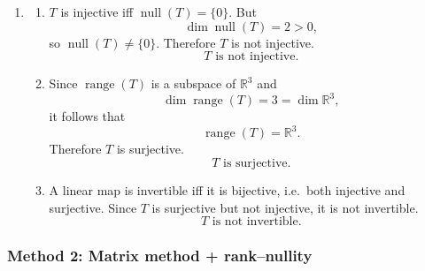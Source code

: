 \documentclass[12pt]{article}
\begin{document}
\begin{enumerate}[label=(\alph*)]
Thus
\[
\boxed{\dim\operatorname{null}(T)=2,\qquad \dim\operatorname{range}(T)=3.}
\]

\item
\begin{enumerate}[label=(\roman*)]
\item $T$ is injective iff $\operatorname{null}(T)=\{0\}$. But
\[
\dim\operatorname{null}(T)=2>0,
\]
so $\operatorname{null}(T)\neq\{0\}$. Therefore $T$ is not injective.
\[
\boxed{\,T\text{ is not injective.}\,}
\]

\item Since $\operatorname{range}(T)$ is a subspace of $\mathbb{R}^3$ and
\[
\dim\operatorname{range}(T)=3=\dim\mathbb{R}^3,
\]
it follows that
\[
\operatorname{range}(T)=\mathbb{R}^3.
\]
Therefore $T$ is surjective.
\[
\boxed{\,T\text{ is surjective.}\,}
\]

\item A linear map is invertible iff it is bijective, i.e.\ both injective and surjective. Since $T$ is surjective but not injective, it is not invertible.
\[
\boxed{\,T\text{ is not invertible.}\,}
\]
\end{enumerate}
\end{enumerate}

\newpage
\subsubsection{Method 2: Matrix method + rank--nullity}
\end{document}
